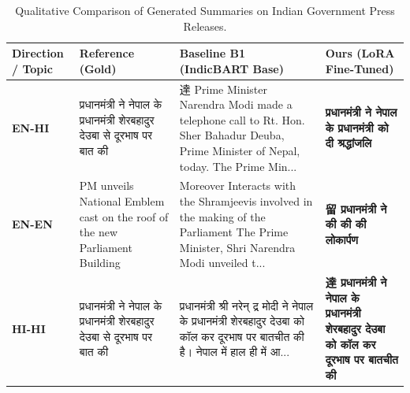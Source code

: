\begin{table}[t]
\centering
\small
\caption{Qualitative Comparison of Generated Summaries on Indian Government Press Releases.}
\label{tab:qualitative}
\begin{tabular}{p{}p{}p{}p{}}
\toprule
\textbf{Direction / Topic} & \textbf{Reference (Gold)} & \textbf{Baseline B1 (IndicBART Base)} & \textbf{Ours (LoRA Fine-Tuned)} \\
\midrule
\textbf{EN-HI} & प्रधानमंत्री ने नेपाल के प्रधानमंत्री शेरबहादुर देउबा से दूरभाष पर बात की & 達 Prime Minister Narendra Modi made a telephone call to Rt. Hon. Sher Bahadur Deuba, Prime Minister of Nepal, today. The Prime Min... & \textbf{प्रधानमंत्री ने नेपाल के प्रधानमंत्री को दी श्रद्धांजलि} \\
\midrule
\textbf{EN-EN} & PM unveils National Emblem cast on the roof of the new Parliament Building & Moreover Interacts with the Shramjeevis involved in the making of the Parliament The Prime Minister, Shri Narendra Modi unveiled t... & \textbf{留 प्रधानमंत्री ने की की की लोकार्पण} \\
\midrule
\textbf{HI-HI} & प्रधानमंत्री ने नेपाल के प्रधानमंत्री शेरबहादुर देउबा से दूरभाष पर बात की & प्रधानमंत्री श्री नरेन् द्र मोदी ने नेपाल के प्रधानमंत्री शेरबहादुर देउबा को कॉल कर दूरभाष पर बातचीत की है। नेपाल में हाल ही में आ... & \textbf{達 प्रधानमंत्री ने नेपाल के प्रधानमंत्री शेरबहादुर देउबा को कॉल कर दूरभाष पर बातचीत की} \\
\bottomrule
\end{tabular}
\end{table}